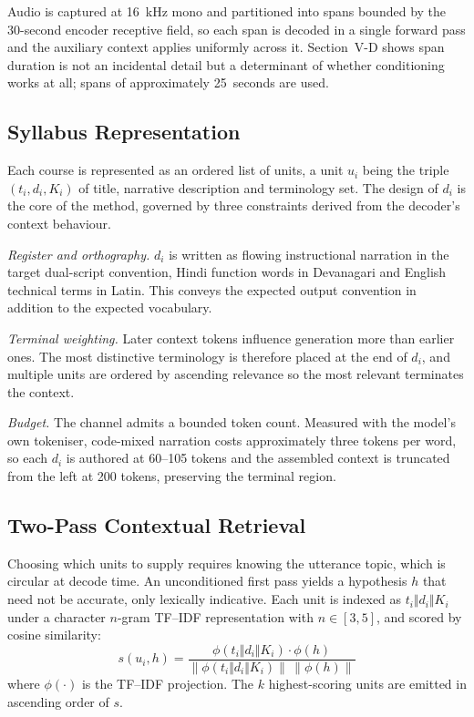 \documentclass[conference]{IEEEtran}
\begin{document}
Audio is captured at 16~kHz mono and partitioned into spans bounded by the
30-second encoder receptive field, so each span is decoded in a single forward
pass and the auxiliary context applies uniformly across it. Section~V-D shows
span duration is not an incidental detail but a determinant of whether
conditioning works at all; spans of approximately 25~seconds are used.

\subsection{Syllabus Representation}

Each course is represented as an ordered list of units, a unit $u_i$ being the
triple $(t_i, d_i, K_i)$ of title, narrative description and terminology set. The
design of $d_i$ is the core of the method, governed by three constraints derived
from the decoder's context behaviour.

\textit{Register and orthography.} $d_i$ is written as flowing instructional
narration in the target dual-script convention, Hindi function words in
Devanagari and English technical terms in Latin. This conveys the expected output
convention in addition to the expected vocabulary.

\textit{Terminal weighting.} Later context tokens influence generation more than
earlier ones. The most distinctive terminology is therefore placed at the end of
$d_i$, and multiple units are ordered by ascending relevance so the most relevant
terminates the context.

\textit{Budget.} The channel admits a bounded token count. Measured with the
model's own tokeniser, code-mixed narration costs approximately three tokens per
word, so each $d_i$ is authored at 60--105 tokens and the assembled context is
truncated from the left at 200 tokens, preserving the terminal region.

\subsection{Two-Pass Contextual Retrieval}

Choosing which units to supply requires knowing the utterance topic, which is
circular at decode time. An unconditioned first pass yields a hypothesis $h$ that
need not be accurate, only lexically indicative. Each unit is indexed as
$t_i \Vert d_i \Vert K_i$ under a character $n$-gram TF--IDF representation with
$n\in[3,5]$, and scored by cosine similarity:
\begin{equation}
s(u_i, h) = \frac{\phi(t_i \Vert d_i \Vert K_i)\cdot\phi(h)}
{\lVert \phi(t_i \Vert d_i \Vert K_i)\rVert\, \lVert \phi(h)\rVert}
\end{equation}
where $\phi(\cdot)$ is the TF--IDF projection. The $k$ highest-scoring units are
emitted in ascending order of $s$.
\end{document}
